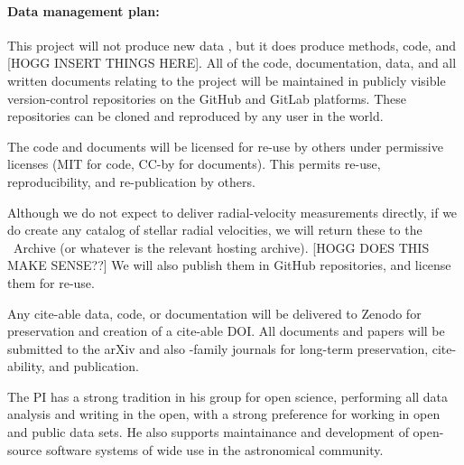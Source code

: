 \documentclass[12pt, letterpaper]{article}
\begin{document}
\paragraph{Data management plan:}
This project will not produce new data , but it does produce
methods, code, and [HOGG INSERT THINGS HERE].
All of the code, documentation, data, and all written documents relating to the
project will be maintained in publicly visible version-control repositories on
the GitHub and GitLab platforms. These repositories can be cloned and reproduced by any
user in the world.

The code and documents will be licensed for re-use by others under permissive
licenses (MIT for code, CC-by for documents). This permits re-use, reproducibility,
and re-publication by others.

Although we do not expect to deliver radial-velocity measurements directly, if
we do create any catalog of stellar radial velocities, we will return these to
the \HARPS\ Archive (or whatever is the relevant hosting archive). [HOGG DOES THIS MAKE SENSE??]
We will also publish them in GitHub repositories, and license them for re-use.

Any cite-able data, code, or documentation will be delivered to Zenodo for
preservation and creation of a cite-able DOI.
All documents and papers will be submitted to the arXiv and also \AAS-family
journals for long-term preservation, cite-ability, and publication.

The PI has a strong tradition in his group for open science, performing
all data analysis and writing in the open, with a strong preference for working
in open and public data sets. He also supports maintainance and development of
open-source software systems of wide use in the astronomical community.
\end{document}
